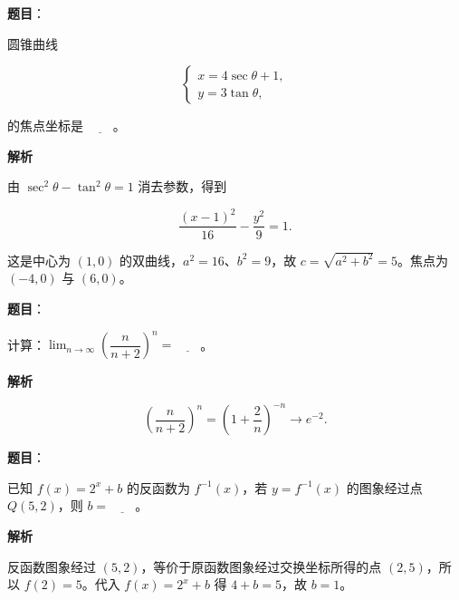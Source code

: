 \begin{answer}

\textbf{题目}：

圆锥曲线

\nopagebreak[4]
\[
\begin{cases}
x=4\sec\theta+1,\\
y=3\tan\theta,
\end{cases}
\]

的焦点坐标是 $\underline{\qquad}$。

\textbf{解析}

由 $\sec^2\theta-\tan^2\theta=1$ 消去参数，得到

\nopagebreak[4]
\[
\frac{(x-1)^2}{16}-\frac{y^2}{9}=1.
\]

这是中心为 $(1,0)$ 的双曲线，$a^2=16$、$b^2=9$，故 $c=\sqrt{a^2+b^2}=5$。焦点为 $(-4,0)$ 与 $(6,0)$。


\end{answer}
\begin{answer}

\textbf{题目}：

计算：$\displaystyle\lim_{n\to\infty}\left(\dfrac{n}{n+2}\right)^n=\underline{\qquad}$。

\textbf{解析}

\nopagebreak[4]
\[
\left(\frac{n}{n+2}\right)^n=\left(1+\frac2n\right)^{-n}\longrightarrow e^{-2}.
\]


\end{answer}
\begin{answer}

\textbf{题目}：

已知 $f(x)=2^x+b$ 的反函数为 $f^{-1}(x)$，若 $y=f^{-1}(x)$ 的图象经过点 $Q(5,2)$，则 $b=\underline{\qquad}$。

\textbf{解析}

反函数图象经过 $(5,2)$，等价于原函数图象经过交换坐标所得的点 $(2,5)$，所以 $f(2)=5$。代入 $f(x)=2^x+b$ 得 $4+b=5$，故 $b=1$。


\end{answer}
